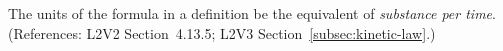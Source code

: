 The units of the  formula in a \KineticLaw definition  be
the equivalent of \emph{substance per time}.  (References: L2V2
Section~4.13.5; L2V3 Section~\ref{subsec:kinetic-law}.)
